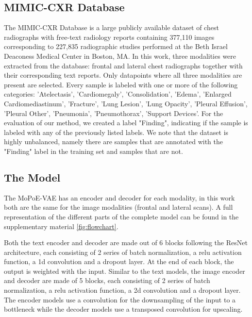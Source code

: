\subsection{MIMIC-CXR Database}
The MIMIC-CXR Database \cite{johnson2019mimic} is a large publicly available dataset of chest radiographs with free-text radiology reports containing 377,110 images corresponding to 227,835 radiographic studies performed at the Beth Israel Deaconess Medical Center in Boston, MA.
In this work, three modalities were extracted from the database: frontal and lateral chest radiographs together with their corresponding text reports. Only datapoints where all three modalities are present are selected.
Every sample is labeled with one or more of the following categories: 'Atelectasis', 'Cardiomegaly', 'Consolidation', 'Edema', 'Enlarged Cardiomediastinum', 'Fracture', 'Lung Lesion', 'Lung Opacity', 'Pleural Effusion', 'Pleural Other', 'Pneumonia', 'Pneumothorax', 'Support Devices'.
For the evaluation of our method, we created a label "Finding", indicating if the sample is labeled with any of the previously listed labels.
We note that the dataset is highly unbalanced, namely there are  samples that are annotated with the "Finding" label in the training set and  samples that are not.

\subsection{The Model}
The MoPoE-VAE has an encoder and decoder for each modality, in this work both are the same for the image modalities (frontal and lateral scans).
A full representation of the different parts of the complete model can be found in the supplementary material \cref{fig:flowchart}.

Both the text encoder and decoder are made out of 6 blocks following the ResNet \cite{he2016deep} architecture, each consisting of 2 series of batch normalization, a relu activation function, a 1d convolution and a dropout layer.
At the end of each block, the output is weighted with the input.
Similar to the text models, the image encoder and decoder are made of 5 blocks, each consisting of 2 series of batch normalization, a relu activation function, a 2d convolution and a dropout layer.
The encoder models use a convolution for the downsampling of the input to a bottleneck while the decoder models use a transposed convolution for upscaling.

